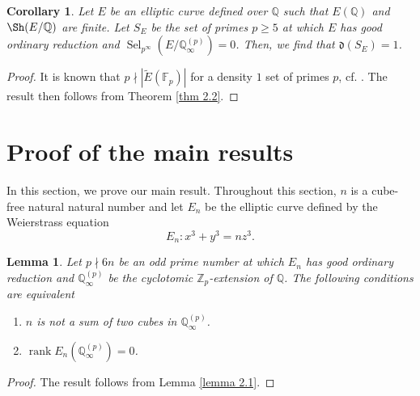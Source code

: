 \documentclass[11pt]{amsart}
\newtheorem{lemma}[theorem]{Lemma}
\newtheorem{corollary}[theorem]{Corollary}
\newcommand{\Z}{\mathbb{Z}}
\newcommand{\Q}{\mathbb{Q}}
\newcommand{\F}{\mathbb{F}}
\newcommand{\op}[1]{\operatorname{#1}}
\numberwithin{equation}{section}
\begin{document}
\begin{corollary}
    Let $E$ be an elliptic curve defined over $\Q$ such that $E(\Q)$ and $\Sh(E/\Q)$ are finite. Let $S_E$ be the set of primes $p\geq 5$ at which $E$ has good ordinary reduction and $\op{Sel}_{p^\infty}(E/\Q_\infty^{(p)})=0$. Then, we find that $\mathfrak{d}(S_E)=1$. 
\end{corollary}
\begin{proof}
    It is known that $p\nmid |\widetilde{E}(\F_p)|$ for a density $1$ set of primes $p$, cf. \cite{vkmurty}. The result then follows from Theorem \ref{thm 2.2}.
\end{proof}


\section{Proof of the main results}

\par In this section, we prove our main result. Throughout this section, $n$ is a cube-free natural natural number and let $E_n$ be the elliptic curve defined by the Weierstrass equation 
\[E_n: x^3+y^3=nz^3.\]

\begin{lemma}\label{lemma3.1}
    Let $p\nmid 6n$ be an odd prime number at which $E_n$ has good ordinary reduction and $\Q_\infty^{(p)}$ be the cyclotomic $\Z_p$-extension of $\Q$. The following conditions are equivalent
    \begin{enumerate}
        \item $n$ is not a sum of two cubes in $\Q_\infty^{(p)}$. 
        \item $\op{rank} E_n(\Q_\infty^{(p)})=0$. 
    \end{enumerate}
\end{lemma}
\begin{proof}
    The result follows from Lemma \ref{lemma 2.1}.
\end{proof}
\end{document}
